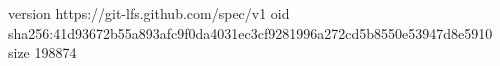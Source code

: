 version https://git-lfs.github.com/spec/v1
oid sha256:41d93672b55a893afc9f0da4031ec3cf9281996a272cd5b8550e53947d8e5910
size 198874
